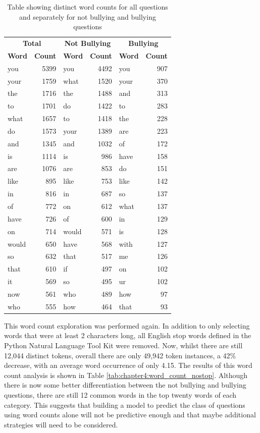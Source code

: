 \begin{table}[h]
\centering
\caption[Distinct word counts]{Table showing distinct word counts for all questions and separately for not bullying and bullying questions}
\label{tab:chapter4:word_count}
\begin{tabular}{lrlrlr}
	\toprule
	\multicolumn{2}{c}{\textbf{Total}} & \multicolumn{2}{c}{\textbf{Not Bullying}} & \multicolumn{2}{c}{\textbf{Bullying}}\\
	\cmidrule(r){1-2}
	\cmidrule(r){3-4}
	\cmidrule(r){5-6}
    \textbf{Word} & \textbf{Count} & \textbf{Word} & \textbf{Count} & \textbf{Word} & \textbf{Count}           \\
    \midrule
	you		& 5399	&	you		&	4492	&	you		&	907	\\
	your	& 1759	&	what	&	1520	&	your	&	370	\\
	the		& 1716	&	the		&	1488	&	and		&	313	\\
	to		& 1701	&	do		&	1422	&	to		&	283	\\
	what	& 1657	&	to		&	1418	&	the		&	228	\\
	do		& 1573	&	your	&	1389	&	are		&	223	\\
	and		& 1345	&	and		&	1032	&	of		&	172	\\
	is		& 1114	&	is		&	986		&	have	&	158	\\
	are		& 1076	&	are		&	853		&	do		&	151	\\
	like	& 895	&	like	&	753		&	like	&	142	\\
	in		& 816	&	in		&	687		&	so		&	137	\\
	of		& 772	&	on		&	612		&	what	&	137	\\
	have	& 726	&	of		&	600		&	in		&	129	\\
	on		& 714	&	would	&	571		&	is		&	128	\\
	would	& 650	&	have	&	568		&	with	&	127	\\
	so		& 632	&	that	&	517		&	me		&	126	\\
	that	& 610	&	if		&	497		&	on		&	102	\\
	it		& 569	&	so		&	495		&	ur		&	102	\\
	now		& 561	&	who		&	489		&	how		&	97	\\
	who		& 555	&	how		&	464		&	that	&	93	\\
    \bottomrule
    \end{tabular}
\end{table}

This word count exploration was performed again. In addition to only selecting words that were at least 2 characters long, all English stop words defined in the Python Natural Language Tool Kit were removed. Now, whilst there are still 12,044 distinct tokens, overall there are only 49,942 token instances, a 42\% decrease, with an average word occurrence of only 4.15. The results of this word count analysis is shown in Table \ref{tab:chapter4:word_count_nostop}.  Although there is now some better differentiation between the not bullying and bullying questions, there are still 12 common words in the top twenty words of each category. This suggests that building a model to predict the class of questions using word counts alone will not be predictive enough and that maybe additional strategies will need to be considered.

